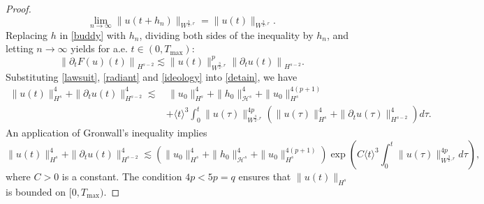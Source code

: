 \documentclass[preprint,compress,12pt]{elsarticle}
\numberwithin{equation}{section}
\begin{document}
\begin{proof}
\begin{equation*}
		\lim\limits_{n\rightarrow\infty} \|u(t+h_{n})\|_{W^{\frac{3}{2},r}}=\|u(t)\|_{W^{\frac{3}{2},r}}.
	\end{equation*}
	Replacing $h$ in \eqref{buddy} with $h_{n}$, dividing both sides of the inequality by $h_{n}$, and letting $n\to\infty$ yields for a.e. $t\in(0,T_{\max})$:
	\begin{equation}\label{ideology} \left\|\partial_{t}F(u)(t)\right\|_{H^{s-2}}\lesssim\|u(t)\|_{W^{\frac{3}{2},r}}^{p}\left\|\partial_{t}u(t)\right\|_{H^{s-2}}.
	\end{equation}
	Substituting \eqref{lawsuit},  \eqref{radiant} and  \eqref{ideology} into \eqref{detain}, we have
	\begin{equation}
		\begin{aligned} \|u(t)\|_{H^{s}}^{4}+\|\partial_{t}u(t)\|_{H^{s-2}}^{4}\lesssim&\,\|u_{0}\|_{H^{s}}^{4}+\|h_{0}\|_{\mathcal{H}^{s}}^{4}+\|u_{0}\|_{H^{s}}^{4(p+1)}\\
			&+ \langle t\rangle^{3} \int_{0}^{t}\|u(\tau)\|_{W^{\frac{3}{2},r}}^{4p} \left(\|u(\tau)\|_{H^{s}}^{4}+\|\partial_{t}u(\tau)\|_{H^{s-2}}^{4}\right)d\tau.
		\end{aligned}
	\end{equation}
	An application of Gronwall's inequality implies
	\begin{equation}\label{defy} \|u(t)\|_{H^{s}}^{4}+\|\partial_{t}u(t)\|_{H^{s-2}}^{4}\lesssim  \left(\|u_{0}\|_{H^{s}}^{4}+\|h_{0}\|_{\mathcal{H}^{s}}^{4}+\|u_{0}\|_{H^{s}}^{4(p+1)}\right) \exp\left(C\langle t\rangle ^{3}\int_{0}^{t} \|u(\tau)\|_{W^{\frac{3}{2},r}}^{4p} d\tau\right),
	\end{equation}
	where $C>0$ is a constant. The condition $4p<5p=q$ ensures that $\|u(t)\|_{H^{s}}$ is bounded on $[0,T_{\max})$.
	

\end{proof}
\end{document}
